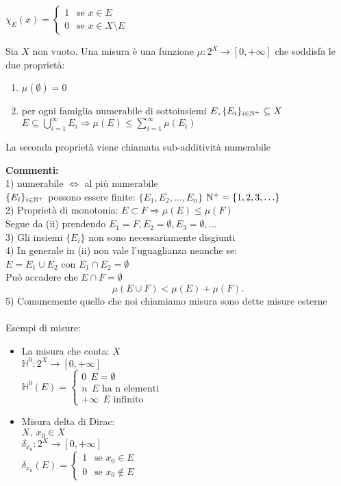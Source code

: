 \documentclass[12px]{article}
\begin{document}
	 $\chi_E(x) = \begin{cases}
		 1 \ \ \text { se } x\in E\\
		 0 \ \ \text { se } x\in X\setminus E
	 \end{cases}$
	 \begin{defi}
		 Sia $X$ non vuoto. Una misura è una funzione $\mu : 2^X \rightarrow [0,+\infty]$ che soddisfa le due proprietà:
		 \begin{enumerate}
			 \item $\mu(\emptyset) = 0$
			 \item  per ogni famiglia numerabile di sottoinsiemi $E,\{E_i\}_{i\in\mathbb{N}^+} \subseteq X$\\
				 $\displaystyle E\subseteq\bigcup_{i=1}^\infty E_i \Rightarrow \mu(E)\leq \sum^\infty_{i=1}\mu(E_i)$
		 \end{enumerate}
		 La seconda proprietà viene chiamata sub-additività numerabile
	 \end{defi}
\textbf{Commenti:}\\
1) numerabile $ \Leftrightarrow $ al più numerabile\\
$\{E_i\}_{i\in\mathbb{N}^+}$ possono essere finite: $\{E_1,E_2,\ldots,E_n\}$ 
$\mathbb{N}^+ = \{1,2,3,\ldots\}$\\
2) Proprietà di monotonia: $E\subset F \Rightarrow \mu(E)\leq \mu (F)$\\
Segue da (ii) prendendo $E_1 = F, E_2 = \emptyset, E_3=\emptyset, \ldots$\\
3) Gli insiemi $\{E_i\}$ non sono necessariamente disgiunti\\
4) In generale in (ii) non vale l'uguaglianza neanche se:\\ $E = E_1\cup E_2 $ con $E_1\cap E_2= \emptyset$\\
Può accadere che $E\cap F = \emptyset$\\
 \[
\mu(E\cup F) < \mu(E) + \mu (F)
.\] 
5) Comunemente quello che noi chiamiamo misura sono dette misure esterne\\
\hline\ \\
Esempi di misure:
\begin{itemize}
	\item La misura che conta: $X$\\
		$\mathbb H^0: 2^X \rightarrow [0,+\infty]$\\
		$\mathbb H^0(E) = \begin{cases}
			0 \ \ E =\emptyset\\
			n \ \ E \text{ ha n elementi}\\
			+\infty \ \ E \text { infinito}
		\end{cases}$
	\item Misura delta di Dirac:\\
		$X, \ x_0\in X$\\
		$\delta_{x_0}: 2^X \rightarrow[0,+\infty]$\\
		$\delta_{x_0}(E) = \begin{cases}
			1 \ \ \text{ se } x_0\in E\\
			0 \ \ \text { se } x_0 \not\in E
		\end{cases}$
\end{itemize}
\end{document}
